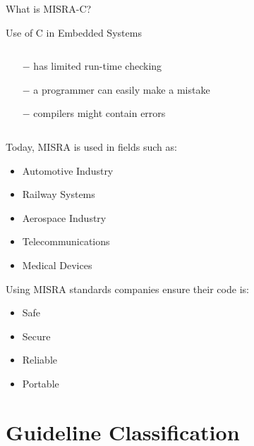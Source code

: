 \documentclass[t]{beamer} %
\begin{document}
\begin{frame}{What is MISRA-C?}
\begin{block}{ Use of C in Embedded Systems}
\begin{columns}
\begin{footnotesize}
         		            \begin{itemize}
          		                \item[$-$] has limited run-time checking
          		                \item[$-$] a programmer can easily make a mistake
          		                \item[$-$] compilers might contain errors
          		            \end{itemize}
                        \end{footnotesize}
                    \end{columns}
                    \end{block}  
  	  
\end{frame}
\begin{frame}
    \begin{block}{}
  		    Today, MISRA is used in fields such as:  
  		        \begin{itemize}
  		            \item Automotive Industry
  		            \item Railway Systems
  		            \item Aerospace Industry
  		            \item Telecommunications
  		            \item Medical Devices
  		        \end{itemize}
  	  \end{block}
  		     Using MISRA standards companies ensure their code is:
  		        \begin{itemize}
  		            \item Safe
  		            \item Secure
  		            \item Reliable
  		            \item Portable
  		        \end{itemize}{}
 	
\end{frame}

\section{Guideline Classification}
\end{document}
